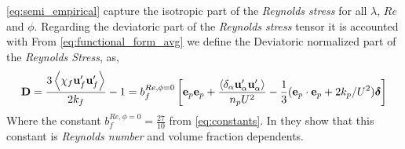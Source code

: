 \ref{eq:semi_empirical} capture the isotropic part of the \textit{Reynolds stress} for all $\lambda$, $Re$ and $\phi$. 
Regarding the deviatoric part of the  \textit{Reynolds stress} tensor it is accounted with 
From \ref{eq:functional_form_avg} we define the Deviatoric normalized part of the \textit{Reynolds Stress}, as, 
\begin{equation*}
    \textbf{D} =
    \frac{3\left<\chi_f\textbf{u}_f'\textbf{u}_f'\right>}{2 k_f} - 1
    = 
    b_f^{Re,\phi = 0} \left[
        \textbf{e}_p\textbf{e}_p
        + \frac{\left<\delta_\alpha \textbf{u}_\alpha'\textbf{u}_\alpha'\right>}{n_p U^2}
         - \frac{1}{3}(\textbf{e}_p\cdot \textbf{e}_p+2k_p/U^2)\bm\delta
    \right]
\end{equation*}
Where the constant $b_f^{Re,\phi =0} = \frac{27}{10}$ from  \ref{eq:constants}. 
In \citet{mehrabadi2015pseudo} they show that this constant is \textit{Reynolds number} and volume fraction dependents. 


